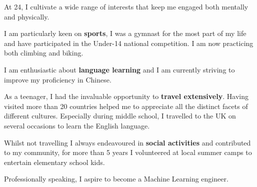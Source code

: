 \documentclass[10pt,a4paper,hidelinks]{article}
\newenvironment{indentsection}[1]%
{\begin{list}{}%
	{\setlength{\leftmargin}{#1}}%
	\item[]%
}
{\end{list}}
\begin{document}
\begin{indentsection}{\parindent}
\begin{flushleft}
At 24, I cultivate a wide range of interests that keep me engaged both mentally and physically. 

\begin{itemize*}
\setlength\itemsep{2pt}
    \item I am particularly keen on \textbf{sports}, I was a gymnast for the most part of my life and have participated in the Under-14 national competition. I am now practicing both climbing and biking.
    \item I am enthusiastic about \textbf{language learning} and I am currently striving to improve my proficiency in Chinese.
    \item As a teenager, I had the invaluable opportunity to \textbf{travel extensively}. Having visited more than 20 countries helped me to appreciate all the distinct facets of different cultures. Especially during middle school, I travelled to the UK on several occasions to learn the English language.
    \item Whilst not travelling I always endeavoured in \textbf{social activities} and contributed to my community, for more than 5 years I volunteered at local summer camps to entertain elementary school kids.
    \item Professionally speaking, I aspire to become a Machine Learning engineer.
\end{itemize*}

\end{flushleft}
\end{indentsection}
\end{document}

